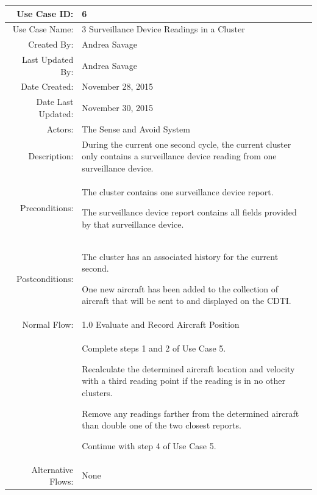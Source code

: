 \documentclass[12pt,oneside,letterpaper]{article}
\newenvironment{packed_enumerate}{ %
\vspace{-7mm}
\begin{enumerate}
  \setlength{\itemsep}{0pt}
  \setlength{\parskip}{0pt}
  \setlength{\parsep}{0pt}
}{\end{enumerate}
\vspace{-8mm}}
\begin{document}
\begin{longtable}{|r|p{3.8in}|}
\hline
Use Case ID:&6\\
\hline
Use Case Name:&3 Surveillance Device Readings in a Cluster\\
\hline
Created By:&Andrea Savage\\
\hline
Last Updated By:&Andrea Savage\\
\hline
Date Created:&November 28, 2015\\
\hline
Date Last Updated:&November 30, 2015\\
\hline
Actors:&The Sense and Avoid System\\
\hline
Description:&During the current one second cycle, the current cluster only contains a surveillance device reading from one surveillance device.\\
\hline
Preconditions:&
\begin{packed_enumerate}
\item The cluster contains one surveillance device report.
\item The surveillance device report contains all fields provided by that surveillance device.
\end{packed_enumerate}\\
\hline
Postconditions: &
\begin{packed_enumerate}
\item The cluster has an associated history for the current second.
\item One new aircraft has been added to the collection of aircraft that will be sent to and displayed on the CDTI.
\end{packed_enumerate}\\
\hline
Normal Flow:&1.0  Evaluate and Record Aircraft Position \\
&  %
\begin{packed_enumerate}
\item Complete steps 1 and 2 of Use Case 5.
\item Recalculate the determined aircraft location and velocity with a third reading point if the reading is in no other clusters.
\item Remove any readings farther from the determined aircraft than double one of the two closest reports.
\item Continue with step 4 of Use Case 5.
\end{packed_enumerate}\\
\hline
Alternative Flows:&None\\

\end{longtable}
\end{document}

